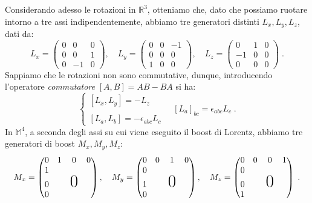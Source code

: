 Considerando adesso le rotazioni in $\mathbb{R}^3$, otteniamo che, dato che possiamo ruotare intorno a tre assi indipendentemente, 
abbiamo tre generatori distinti $L_x,L_y,L_z$, dati da:
\begin{equation}
L_x = \begin{pmatrix}
0 & 0 & 0 \\
0 & 0 & 1 \\
0 & -1 & 0
\end{pmatrix},\quad L_y =\begin{pmatrix}
0 & 0 & -1 \\
0 & 0 & 0 \\
1 & 0 & 0
\end{pmatrix}, \quad L_z=\begin{pmatrix}
0 & 1 & 0 \\
-1 & 0 & 0 \\
0 & 0 & 0
\end{pmatrix}\;.
\end{equation}
Sappiamo che le rotazioni non sono commutative, dunque, introducendo l'operatore \textit{commutatore} $[A,B]=AB-BA$ si ha:
\begin{equation}
\begin{cases}
[L_x,L_y]=-L_z \\
\\
[L_a,L_b]=-\epsilon_{abc}L_c
\end{cases}\quad [L_a]_{bc}=\epsilon_{abc}L_c\;.
\end{equation}
In $\mathbb{M}^4$, a seconda degli assi su cui viene eseguito il boost di Lorentz, abbiamo tre generatori di boost $M_x,M_y,M_z$:
\begin{equation}
M_x = \begin{pmatrix}
0 & 1 & 0 & 0 \\
1 & {} & {} &{} \\
0 & {} &\mbox{\huge{0}} & {} \\
0 & {} & {} & {}
\end{pmatrix},\quad M_y=\begin{pmatrix}
0 & 0 & 1 & 0 \\
0 & {} & {} & {} \\
1 & {} &\mbox{\huge{0}} & {} \\
0 & {} & {} & {}
\end{pmatrix}, \quad M_z=\begin{pmatrix}
0 & 0 & 0 & 1 \\
0 & {} & {} & {} \\
0 & {} &\mbox{\huge{0}} & {} \\
1 & {} & {} & {}
\end{pmatrix}\;.
\end{equation}
